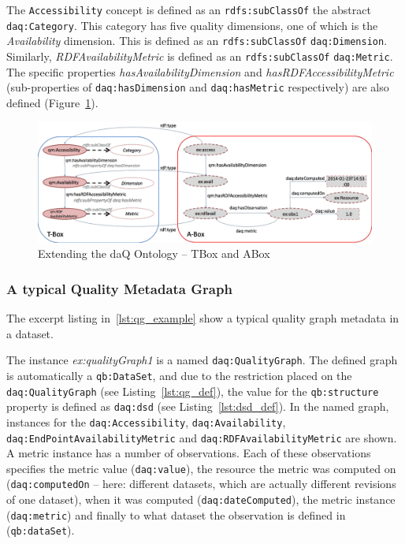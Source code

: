 The \texttt{Accessibility} concept is defined as an \texttt{rdfs:subClassOf} the abstract \texttt{daq:Category}.
This category has five quality dimensions, one of which is the \textit{Availability} dimension.
This is defined as an \texttt{rdfs:subClassOf} \texttt{daq:Dimension}.
Similarly, \textit{RDFAvailabilityMetric} is defined as an \texttt{rdfs:subClassOf} \texttt{daq:Metric}.
The specific properties \textit{hasAvailabilityDimension} and \textit{hasRDFAccessibilityMetric} (sub-properties of \texttt{daq:hasDimension} and \texttt{daq:hasMetric} respectively) are also defined (Figure~\ref{fig:ext_daq}).

\begin{figure}[tbph]
\begin{center}
\includegraphics[width=\textwidth]{images/abox-tbox.png}
\caption{Extending the daQ Ontology – TBox and ABox}
\label{fig:ext_daq}
\end{center}
\end{figure}

\subsubsection{A typical Quality Metadata Graph}
The excerpt listing in~\ref{lst:qg_example} show a typical quality graph metadata in a dataset.

The instance \emph{ex:qualityGraph1} is a named \texttt{daq:QualityGraph}.
The defined graph is automatically a \texttt{qb:DataSet}, and due to the restriction placed on the \texttt{daq:QualityGraph} (see Listing~\ref{lst:qg_def}), the value for the \texttt{qb:structure} property is defined as \texttt{daq:dsd} (see Listing~\ref{lst:dsd_def}).
In the named graph, instances for the \texttt{daq:Accessibility}, \texttt{daq:Availability}, \texttt{daq:EndPointAvailabilityMetric} and \texttt{daq:RDFAvailabilityMetric} are shown.
A metric instance has a number of observations.
Each of these observations specifies the metric value (\texttt{daq:value}), the resource the metric was computed on (\texttt{daq:computedOn} – here: different datasets, which are actually different revisions of one dataset), when it was computed (\texttt{daq:dateComputed}), the metric instance (\texttt{daq:metric}) and finally to what dataset the observation is defined in (\texttt{qb:dataSet}).

